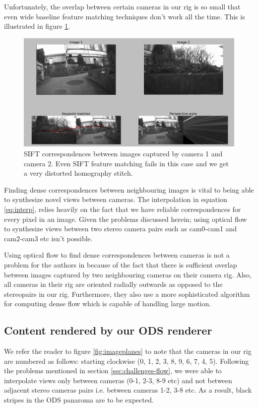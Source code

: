 \documentclass[10pt,twocolumn,letterpaper]{article}
\begin{document}
Unfortunately, the overlap between certain cameras in our rig is so small that even wide baseline feature matching techniques don't work all the time. This is illustrated in figure \ref{fig:homo-12}.
\begin{figure}
\centering
\includegraphics[width=\linewidth]{../results/homography-stitch/cam1-cam2-bad.png}
\caption{SIFT correspondences between images captured by camera 1 and camera 2. Even SIFT feature matching fails in this case and we get a very distorted homography stitch.}
\label{fig:homo-12}
\end{figure}

Finding dense correspondences between neighbouring images is vital to being able to synthesize novel views between cameras. The interpolation in equation \ref{eq:interp}, relies heavily on the fact that we have reliable correspondences for every pixel in an image. 
Given the problems discussed herein; using optical flow to synthesize views between two stereo camera pairs such as cam0-cam1 and cam2-cam3 etc isn't possible. 

Using optical flow to find dense correspondences between cameras is not a problem for the authors in \cite{jump16} because of the fact that there is sufficient overlap between images captured by two neighbouring cameras on their camera rig. Also, all cameras in their rig are oriented radially outwards as opposed to the stereopairs in our rig. Furthermore, they also use a more sophisticated algorithm for computing dense flow which is capable of handling large motion.

\subsection{Content rendered by our ODS renderer}
\label{ods-results}
We refer the reader to figure \ref{fig:imageplanes} to note that the cameras in our rig are numbered as follows: starting clockwise (0, 1, 2, 3, 8, 9, 6, 7, 4, 5). Following the problems mentioned in section \ref{sec:challenges-flow}, we were able to interpolate views only between cameras (0-1, 2-3, 8-9 etc) and not between adjacent stereo cameras pairs i.e. between cameras 1-2, 3-8 etc. As a result, black stripes in the ODS panaroma are to be expected.
\end{document}
